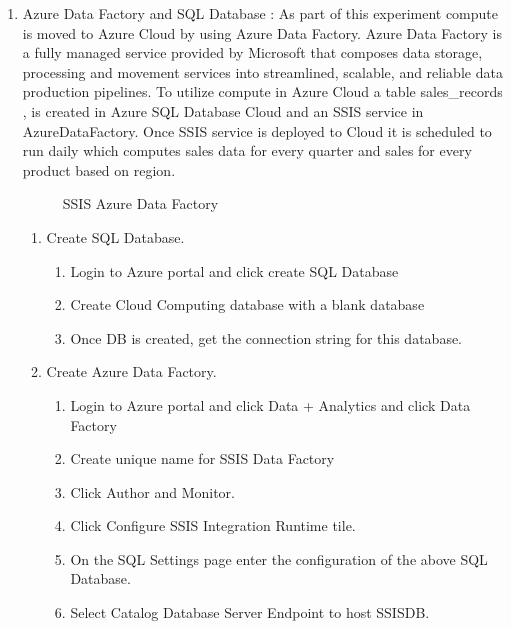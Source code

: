 \documentclass[journal]{hybrid-cloud}
\begin{document}
\begin{enumerate}
	\item Azure Data Factory and SQL Database : As part of this experiment compute is moved to Azure Cloud by using Azure Data Factory. Azure Data Factory is a fully managed service provided by Microsoft that composes data storage, processing and movement services into streamlined, scalable, and reliable data production pipelines. To utilize compute in Azure Cloud a table sales\_records , is created in Azure SQL Database Cloud and an SSIS service in AzureDataFactory. Once SSIS service is deployed to Cloud it is scheduled to  run daily which computes sales data for every quarter and sales for every product based on region.
	\begin{figure}[!htb]
    \caption{\label{fig:SSIS_ADF} SSIS Azure Data Factory}
	\end{figure}

	\begin{enumerate}
 		\item Create SQL Database. 
 		\begin{enumerate}
 			\item Login to Azure portal and click create SQL Database
			\item Create Cloud Computing database with a blank database
			\item Once DB is created, get the connection string for this database.
 		\end{enumerate}  
 		\item Create Azure Data Factory. 
 		\begin{enumerate}
 			\item Login to Azure portal and click Data + Analytics and click Data Factory
			\item Create unique name for SSIS Data Factory
			\item Click Author and Monitor.
			\item Click Configure SSIS Integration Runtime tile.
			\item On the SQL Settings page enter the configuration of the above SQL Database.
			\item Select Catalog Database Server Endpoint to host SSISDB.
 		\end{enumerate}  
	\end{enumerate}



\end{enumerate}
\end{document}
